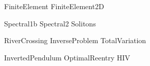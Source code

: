 \documentclass[opener-c,labs,green,nociteref]{HJnewsiambook}
\begin{document}
{FiniteElement}
{FiniteElement2D}

{Spectral1b}
{Spectral2}
{Solitons}

{RiverCrossing}
{InverseProblem}
{TotalVariation}

{InvertedPendulum}
{OptimalReentry}
{HIV}
\end{document}
